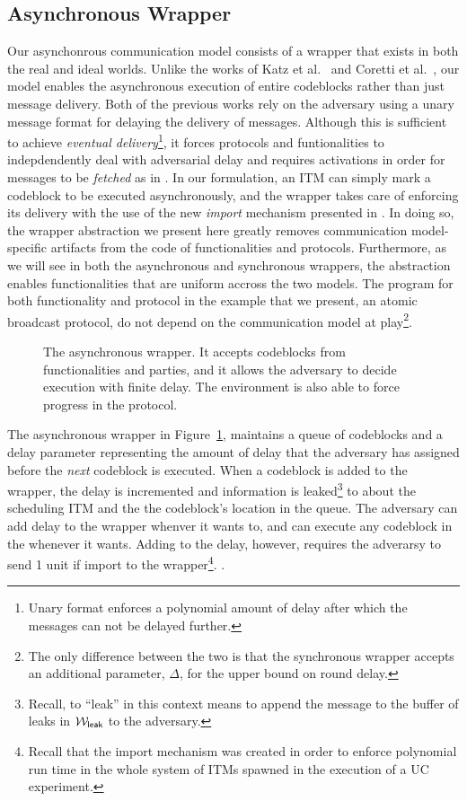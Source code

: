 \subsection{Asynchronous Wrapper}
Our asynchonrous communication model consists of a wrapper that exists in both the real and ideal worlds.
Unlike the works of Katz et al.~\cite{katz-clock} and Coretti et al.~\cite{coretti}, our model enables the asynchronous execution of entire codeblocks rather than just message delivery.
Both of the previous works rely on the adversary using a unary message format for delaying the delivery of messages.
Although this is sufficient to achieve {\em eventual delivery}\footnote{Unary format enforces a polynomial amount of delay after which the messages can not be delayed further.}, it forces protocols and funtionalities to indepdendently deal with adversarial delay and requires activations in order for messages to be {\em fetched} as in \cite{coretti}.
In our formulation, an ITM can simply mark a codeblock to be executed asynchronously, and the wrapper takes care of enforcing its delivery with the use of the new {\em import} mechanism presented in \cite{uc}.
In doing so, the wrapper abstraction we present here greatly removes communication model-specific artifacts from the code of functionalities and protocols. 
Furthermore, as we will see in both the asynchronous and synchronous wrappers, the abstraction enables functionalities that are uniform accross the two models.
The program for both functionality and protocol in the example that we present, an atomic broadcast protocol, do not depend on the communication model at play\footnote{The only difference between the two is that the synchronous wrapper accepts an additional parameter, $\Delta$, for the upper bound on round delay.}.

\begin{figure}
\centering
	
	\caption{The asynchronous wrapper. It accepts codeblocks from functionalities and parties, and it allows the adversary to decide execution with finite delay. The environment is also able to force progress in the protocol.}
	\label{fig:wrapper:async}
\end{figure}

The asynchronous wrapper in Figure~\ref{fig:wrapper:async}, maintains a queue of codeblocks and a delay parameter representing the amount of delay that the adversary has assigned before the {\em next} codeblock is executed. 
When a codeblock is added to the wrapper, the delay is incremented and information is leaked\footnote{Recall, to ``leak'' in this context means to append the message to the buffer of leaks in $\mathcal{W}_{{\mathsf {leak}}}$ to the adversary.} to  about the scheduling ITM and the the codeblock's location in the queue.
The adversary can add delay to the wrapper whenver it wants to, and can execute any codeblock in the  whenever it wants.
Adding to the delay, however, requires the adverarsy to send 1 unit if import to the wrapper\footnote{Recall that the import mechanism was created in order to enforce polynomial run time in the whole system of ITMs spawned in the execution of a UC experiment.}.
.

